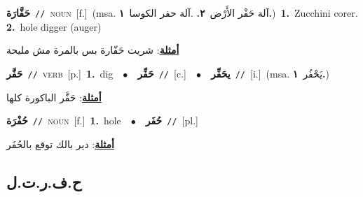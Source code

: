 \documentclass[10pt,a4paper,twoside]{article} %
\begin{document}
\begin{multicols}{2}
{\setlength\topsep{0pt}\textbf{\foreignlanguage{arabic}{حَفَّارَة}}\ {\color{gray}\texttt{//}\color{black}}\ \textsc{noun}\ [f.]\ \color{gray}(msa. \foreignlanguage{arabic}{آلة حَفْر الأَرْض}~\foreignlanguage{arabic}{\textbf{٢.}}  .\foreignlanguage{arabic}{آلة حفر الكوسا}~\foreignlanguage{arabic}{\textbf{١.}})\color{black}\ \textbf{1.}~Zucchini corer.  \textbf{2.}~hole digger (auger)\  \begin{flushright}\color{gray}\foreignlanguage{arabic}{\textbf{\underline{\foreignlanguage{arabic}{أمثلة}}}: شريت حَفّارة بس بالمرة مش مليحة}\end{flushright}\color{black}} \vspace{2mm}

{\setlength\topsep{0pt}\textbf{\foreignlanguage{arabic}{حَفَّر}}\ {\color{gray}\texttt{//}\color{black}}\ \textsc{verb}\ [p.]\ \textbf{1.}~dig\ \ $\bullet$\ \ \setlength\topsep{0pt}\textbf{\foreignlanguage{arabic}{حَفِّر}}\ {\color{gray}\texttt{//}\color{black}}\ [c.]\ \ $\bullet$\ \ \setlength\topsep{0pt}\textbf{\foreignlanguage{arabic}{يحَفِّر}}\ {\color{gray}\texttt{//}\color{black}}\ [i.]\ \color{gray}(msa. \foreignlanguage{arabic}{يَحْفُر}~\foreignlanguage{arabic}{\textbf{١.}})\color{black}\  \begin{flushright}\color{gray}\foreignlanguage{arabic}{\textbf{\underline{\foreignlanguage{arabic}{أمثلة}}}: حَفَّر الباكورة كلها}\end{flushright}\color{black}} \vspace{2mm}

{\setlength\topsep{0pt}\textbf{\foreignlanguage{arabic}{حُفْرَة}}\ {\color{gray}\texttt{//}\color{black}}\ \textsc{noun}\ [f.]\ \textbf{1.}~hole\ \ $\bullet$\ \ \setlength\topsep{0pt}\textbf{\foreignlanguage{arabic}{حُفَر}}\ {\color{gray}\texttt{//}\color{black}}\ [pl.]\  \begin{flushright}\color{gray}\foreignlanguage{arabic}{\textbf{\underline{\foreignlanguage{arabic}{أمثلة}}}: دير بالك توقع بالحُفَر}\end{flushright}\color{black}} \vspace{2mm}

\vspace{-3mm}
\subsection*{\color{blue}\foreignlanguage{arabic}{ح.ف.ر.ت.ل}\color{blue}{ (ntws)}} 


\end{multicols}
\end{document}
